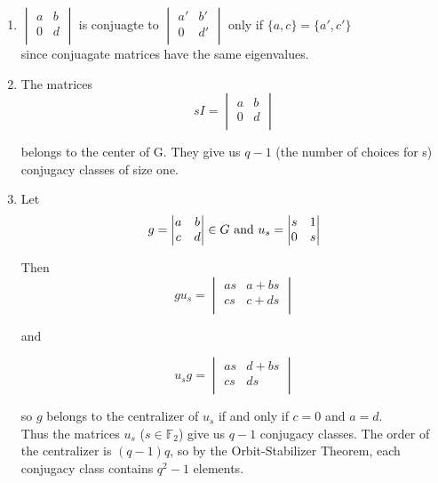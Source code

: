 \documentclass[12pt,twoside]{reedthesis}
\begin{document}
\begin{enumerate}

\item 
$ \begin{vmatrix}
a&b\\
0&d\\
\end{vmatrix}
$
is conjuagte to
$ \begin{vmatrix}
a'&b'\\
0&d'\\
\end{vmatrix}
$
only if $\{a,c\} = \{a',c'\}$ \\
since conjuagate matrices have the same eigenvalues.


\item The matrices 
\[sI = \begin{vmatrix}
a&b\\
0&d\\
\end{vmatrix}
\]

belongs to the center of G.  They give us $q-1$ (the number of choices for s) conjugacy classes of size one.


\item 
Let
\[ g= \begin{vmatrix}
a&b\\
c&d\\
\end{vmatrix}
\in{G}   \textnormal{ and  }    u_s =
\begin{vmatrix}
s&1\\
0&s\\
\end{vmatrix}
\]

Then
\[
gu_s =
\begin{vmatrix}
as&a+bs\\
cs&c+ds\\
\end{vmatrix}
\]

and

\[
u_sg =
\begin{vmatrix}
as&d+bs\\
cs&ds\\
\end{vmatrix}
\]

so $g$ belongs to the centralizer of $u_s$ if and only if $c=0$ and $a=d$.\\
Thus the matrices $u_s$ ($s\in{\mathbb{F}_2}$) give us $q-1$ conjugacy classes.  The order of the centralizer is $(q-1)q$, so by the Orbit-Stabilizer Theorem, each conjugacy class contains $q^2-1$ elements.



\end{enumerate}
\end{document}
